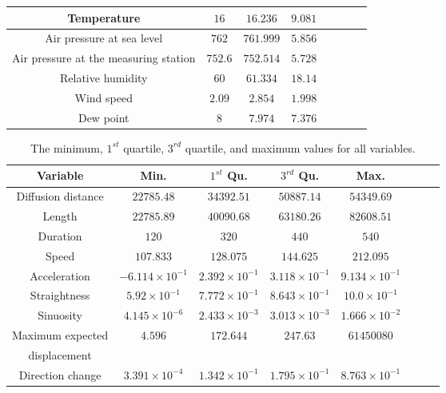 \let\LaTeXcline\cline\documentclass[sn-mathphys-num]{sn-jnl}\let\cline\LaTeXcline
\begin{document}
\begin{table}[!ht]
\begin{tabular}{|c|c|c|c|c|c|c|c|}
            Temperature & $16$ & $16.236$ & $9.081$ \\ \hline
            Air pressure at sea level & $762$ & $761.999$ & $5.856$ \\ \hline
            Air pressure at the measuring station & $752.6$ & $752.514$ & $5.728$ \\ \hline
            Relative humidity & $60$ & $61.334$ & $18.14$ \\ \hline
            Wind speed & $2.09$ & $2.854$ & $1.998$ \\ \hline
            Dew point & $8$ & $7.974$ & $7.376$ \\ \hline
        \end{tabular}
\end{table}

\begin{table}[!ht]
    \centering
    \caption{The minimum, $1^{st}$ quartile, $3^{rd}$ quartile, and maximum values for all variables.}
    \label{tab:minmax}
        \begin{tabular}{|c|c|c|c|c|c|c|c|}
            \hline
            Variable & Min. & $1^{st}$ Qu. & $3^{rd}$ Qu. & Max. \\ \hline
            Diffusion distance & $22785.48$ & $34392.51$ & $50887.14$ & $54349.69$ \\ \hline
            Length & $22785.89$ & $40090.68$ & $63180.26$ & $82608.51$ \\ \hline
            Duration & $120$ & $320$ & $440$ & $540$ \\ \hline
            Speed & $107.833$ & $128.075$ & $144.625$ & $212.095$ \\ \hline
            Acceleration & $-6.114 \times 10^{-1}$ & $2.392 \times 10^{-1}$ & $3.118 \times 10^{-1}$ & $9.134 \times 10^{-1}$ \\ \hline  
            Straightness & $5.92 \times 10^{-1}$ & $7.772 \times 10^{-1}$ & $8.643 \times 10^{-1}$ & $10.0 \times 10^{-1}$ \\ \hline     
            Sinuosity & $4.145 \times 10^{-6}$ & $2.433 \times 10^{-3}$ & $3.013 \times 10^{-3}$ & $1.666 \times 10^{-2}$ \\ \hline      
            Maximum expected & \multirow{2}{*}{$4.596$} &  \multirow{2}{*}{$172.644$} &  \multirow{2}{*}{$247.63$} &  \multirow{2}{*}{$61450080$} \\
            displacement & & & & \\ \hline
            Direction change & \multirow{2}{*}{$3.391 \times 10^{-4}$} & \multirow{2}{*}{$1.342 \times 10^{-1}$} & \multirow{2}{*}{$1.795 \times 10^{-1}$} & \multirow{2}{*}{$8.763 \times 10^{-1}$} \\

\end{tabular}
\end{table}
\end{document}
